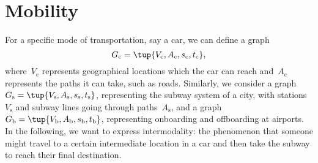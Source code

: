 

\section{Mobility}

For a specific mode of transportation, say a car, we can define a graph
\begin{equation*}
  G_\mathrm{c}=\tup{V_\mathrm{c},A_\mathrm{c},s_\mathrm{c},t_\mathrm{c}},
\end{equation*}
where~$V_\mathrm{c}$ represents geographical locations which the car can reach and~$A_\mathrm{c}$ represents the paths it can take, such as roads. Similarly, we consider a graph~$G_\mathrm{s}=\tup{V_\mathrm{s},A_\mathrm{s},s_\mathrm{s},t_\mathrm{s}}$, representing the subway system of a city, with stations~$V_\mathrm{s}$ and subway lines going through paths~$A_\mathrm{s}$, and a graph $G_\mathrm{b}=\tup{V_\mathrm{b},A_\mathrm{b},s_\mathrm{b},t_\mathrm{b}}$, representing onboarding and offboarding at airports. In the following, we want to express intermodality: the phenomenon that someone might travel to a certain intermediate location in a car and then take the subway to reach their final destination.

